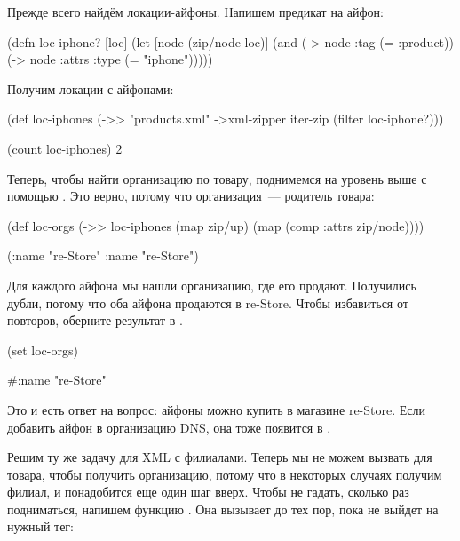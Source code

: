 Прежде всего найдём локации-айфоны. Напишем предикат на айфон:

\begin{english}
  \begin{clojure}
(defn loc-iphone? [loc]
  (let [node (zip/node loc)]
    (and (-> node :tag (= :product))
         (-> node :attrs :type (= "iphone")))))
  \end{clojure}
\end{english}

Получим локации с айфонами:

\begin{english}
  \begin{clojure}
(def loc-iphones
  (->> "products.xml"
       ->xml-zipper
       iter-zip
       (filter loc-iphone?)))

(count loc-iphones)
2
  \end{clojure}
\end{english}

Теперь, чтобы найти организацию по товару, поднимемся на уровень выше с помощью
. Это верно, потому что организация~--- родитель товара:

\begin{english}
  \begin{clojure}
(def loc-orgs
  (->> loc-iphones
       (map zip/up)
       (map (comp :attrs zip/node))))

({:name "re-Store"}
 {:name "re-Store"})
  \end{clojure}
\end{english}

Для каждого айфона мы нашли организацию, где его продают. Получились дубли,
потому что оба айфона продаются в re-Store. Чтобы избавиться от повторов,
оберните результат в .

\begin{english}
  \begin{clojure}
(set loc-orgs)

#{{:name "re-Store"}}
  \end{clojure}
\end{english}

Это и есть ответ на вопрос: айфоны можно купить в магазине re-Store. Если
добавить айфон в организацию DNS, она тоже появится в .

Решим ту же задачу для XML с филиалами. Теперь мы не можем вызвать 
для товара, чтобы получить организацию, потому что в некоторых случаях получим
филиал, и понадобится еще один шаг вверх. Чтобы не гадать, сколько раз
подниматься, напишем функцию . Она вызывает  до тех
пор, пока не выйдет на нужный тег:

